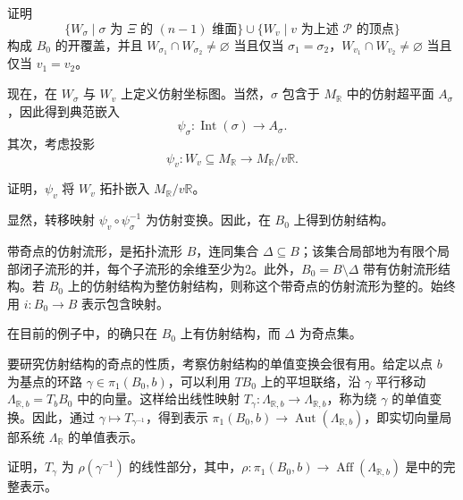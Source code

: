 \begin{exercise}\label{exer:6.75}
证明
\[
\{W_\sigma\mid\sigma\text{ 为 }\Xi\text{ 的 }(n-1)\text{ 维面}\}
\cup\{W_v\mid v\text{ 为上述 }\mathcal P\text{ 的顶点}\}
\]
构成 $B_0$ 的开覆盖，并且 $W_{\sigma_1}\cap W_{\sigma_2}\ne\varnothing$ 当且仅当 $\sigma_1=\sigma_2$，$W_{v_1}\cap W_{v_2}\ne\varnothing$ 当且仅当 $v_1=v_2$。
\end{exercise}

现在，在 $W_\sigma$ 与 $W_v$ 上定义仿射坐标图。当然，$\sigma$ 包含于 $M_{\mathbb R}$ 中的仿射超平面 $A_\sigma$，因此得到典范嵌入
\[
\psi_\sigma\colon\operatorname{Int}(\sigma)\longrightarrow A_\sigma.
\]
其次，考虑投影
\[
\psi_v\colon W_v\subseteq M_{\mathbb R}\longrightarrow M_{\mathbb R}/v\mathbb R.
\]

\begin{exercise}\label{exer:6.76}
证明，$\psi_v$ 将 $W_v$ 拓扑嵌入 $M_{\mathbb R}/v\mathbb R$。
\end{exercise}

显然，转移映射 $\psi_v\circ\psi_\sigma^{-1}$ 为仿射变换。因此，在 $B_0$ 上得到仿射结构。

\begin{definition}\label{def:6.77}
带奇点的仿射流形，是拓扑流形 $B$，连同集合 $\Delta\subseteq B$；该集合局部地为有限个局部闭子流形的并，每个子流形的余维至少为2。此外，$B_0=B\setminus\Delta$ 带有仿射流形结构。若 $B_0$ 上的仿射结构为整仿射结构，则称这个带奇点的仿射流形为整的。始终用 $i\colon B_0\to B$ 表示包含映射。
\end{definition}

在目前的例子中，的确只在 $B_0$ 上有仿射结构，而 $\Delta$ 为奇点集。

要研究仿射结构的奇点的性质，考察仿射结构的单值变换会很有用。给定以点 $b$ 为基点的环路 $\gamma\in\pi_1(B_0,b)$，可以利用 $TB_0$ 上的平坦联络，沿 $\gamma$ 平行移动 $\Lambda_{\mathbb R,b}=T_bB_0$ 中的向量。这样给出线性映射 $T_\gamma\colon\Lambda_{\mathbb R,b}\to\Lambda_{\mathbb R,b}$，称为绕 $\gamma$ 的单值变换。因此，通过 $\gamma\mapsto T_{\gamma^{-1}}$，得到表示 $\pi_1(B_0,b)\to\operatorname{Aut}(\Lambda_{\mathbb R,b})$，即实切向量局部系统 $\Lambda_{\mathbb R}$ 的单值表示。

\begin{exercise}\label{exer:6.78}
证明，$T_\gamma$ 为 $\rho(\gamma^{-1})$ 的线性部分，其中，$\rho\colon\pi_1(B_0,b)\to\operatorname{Aff}(\Lambda_{\mathbb R,b})$ 是中的完整表示。
\end{exercise}

